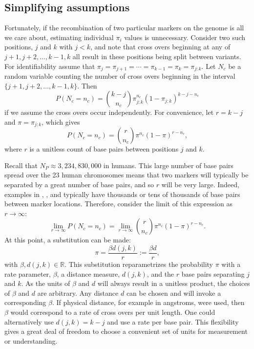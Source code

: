 \documentclass[sts]{imsart}
\newcommand{\field}[1]{\mathbb{#1}}
\newcommand{\Reals}{\field{R}}
\begin{document}
\subsection{Simplifying assumptions} \label{subsec:simplify}

Fortunately, if the recombination of two particular markers on the genome is all we care about, estimating individual $\pi_i$ values is unnecessary. Consider two such positions, $j$ and $k$ with $j < k$, and note that cross overs beginning at any of $j+1, j+2, \dots, k-1, k$ all result in these positions being split between variants. For identifiability assume that $\pi_j = \pi_{j+1} = \cdots = \pi_{k-1} = \pi_k = \pi_{j:k}$. Let $N_c$ be a random variable counting the number of cross overs beginning in the interval $\{j+1,j+2,\dots,k-1,k\}$. Then
$$P(N_c = n_c) = {k - j \choose n_c} \pi_{j:k}^{n_c} (1-\pi_{j:k})^{k - j - n_c}$$
if we assume the cross overs occur independently. For convenience, let $r = k - j$ and $\pi = \pi_{j:k}$, which gives
\begin{equation} \label{eq:binomialDist}
  P(N_c = n_c) = {r \choose n_c} \pi^{n_c} (1-\pi)^{r - n_c},
\end{equation}
where $r$ is a unitless count of base pairs between positions $j$ and $k$.

Recall that $N_P \approx 3,234,830,000$ in humans. This large number of base pairs spread over the 23 human chromosomes means that two markers will typically be separated by a great number of base pairs, and so $r$ will be very large. Indeed, examples in \cite{nyholt2004}, \cite{Salyakina2005}, and \cite{Galwey2009} typically have thousands or tens of thousands of base pairs between marker locations. Therefore, consider the limit of this expression as $r \rightarrow \infty$:
$$\lim_{r \rightarrow \infty} P(N_c = n_c) = \lim_{r \rightarrow \infty} {r \choose n_c} \pi^{n_c} (1-\pi)^{r - n_c}.$$
At this point, a substitution can be made:
$$\pi = \frac{\beta d(j,k)}{r} := \frac{\beta d}{r},$$
with $\beta, d(j,k) \in \Reals$. This substitution reparametrizes the probability $\pi$ with a rate parameter, $\beta$, a distance measure, $d(j,k)$, and the $r$ base pairs separating $j$ and $k$. As the units of $\beta$ and $d$ will always result in a unitless product, the choices of $\beta$ and $d$ are arbitrary. Any distance $d$ can be chosen and will invoke a corresponding $\beta$. If physical distance, for example in angstroms, were used, then $\beta$ would correspond to a rate of cross overs per unit length. One could alternatively use $d(j,k)=k-j$ and use a rate per base pair. This flexibility gives a great deal of freedom to choose a convenient set of units for measurement or understanding.
\end{document}
